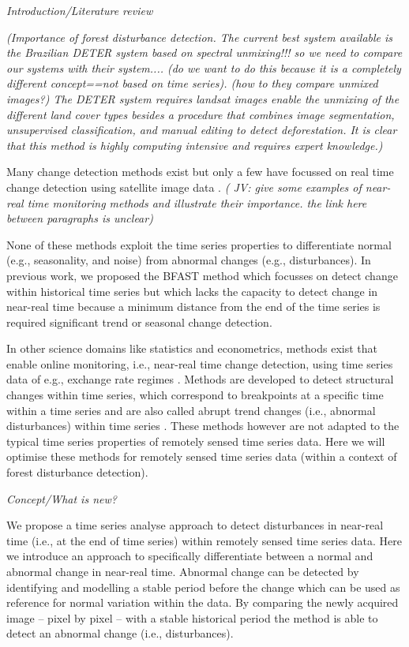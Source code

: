 \documentclass[authoryear,preprint,review,10pt]{elsarticle}
\newcommand{\fixme}[1]{\emph{\marginpar{FIXME} (#1)}}
\newcommand{\readme}[1]{\emph{\marginpar{README} (#1)}}
\begin{document}
\emph{Introduction/Literature review}

\readme{Importance of forest disturbance detection.
The current best system available is the Brazilian DETER system based on
spectral unmixing!!! so we need to compare our systems with their system.... (do
we want to do this because it is a completely different concept==not based on
time series).  (how to they compare unmixed images?) The DETER system
requires landsat images enable the unmixing of the different land cover types
besides a procedure that combines image segmentation, unsupervised
classification, and manual editing to detect deforestation. It is clear that
this method is highly computing intensive and requires expert knowledge.}

Many change detection methods exist but only a few have focussed on real time
change detection using satellite image data
\citep{Shimabukuro:2006vb,White2006}.  
\fixme{ JV: give some examples of near-real time monitoring methods and illustrate their importance. the link here between paragraphs is unclear}


None of these methods exploit
the time series properties to differentiate normal (e.g., seasonality, and noise)
from abnormal changes (e.g., disturbances). In previous work, we proposed the
BFAST method which focusses on detect change within historical time series but
which lacks the capacity to detect change in near-real time because a minimum
distance from the end of the time series is required significant trend or
seasonal change detection.

In other science domains like statistics and econometrics, methods exist that
enable online monitoring, i.e., near-real time change detection, using time
series data of e.g., exchange rate regimes \citep{Zeileis:2010tt}. Methods are
developed to detect structural changes within time series, which correspond to
breakpoints at a specific time within a time series and are also called abrupt
trend changes (i.e., abnormal disturbances) within time series
\citep{Verbesselt2009a}. These methods however are not adapted to the typical
time series properties of remotely sensed time series data. Here we will
optimise these methods for remotely sensed time series data (within a context of
forest disturbance detection).

\emph{Concept/What is new?}

We propose a time series analyse approach to detect disturbances in near-real
time (i.e., at the end of time series) within remotely sensed time series data.
Here we introduce an approach to specifically differentiate between a normal and
abnormal change in near-real time. Abnormal change can be detected by
identifying and modelling a stable period before the change which can be used as
reference for normal variation within the data. By comparing the newly acquired
image -- pixel by pixel -- with a stable historical period the method is able to
detect an abnormal change (i.e., disturbances).
\end{document}

